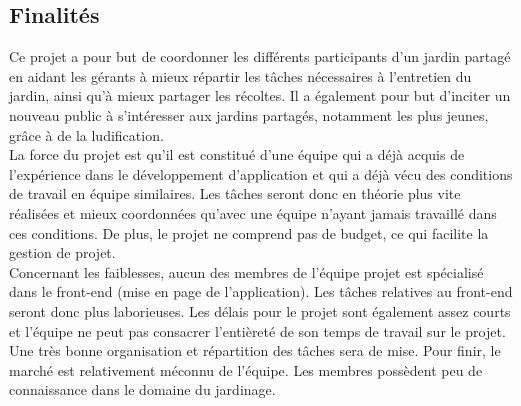 \documentclass{report}
\begin{document}
    
    \subsection*{Finalités}
    Ce projet a pour but de coordonner les différents participants d'un jardin partagé en aidant les gérants à mieux répartir les tâches nécessaires à l'entretien du jardin, ainsi qu'à mieux partager les récoltes. Il a également pour but d'inciter un nouveau public à s'intéresser aux jardins partagés, notamment les plus jeunes, grâce à de la ludification.\\
    
    La force du projet est qu'il est constitué d'une équipe qui a déjà acquis de l'expérience dans le développement d'application et qui a déjà vécu des conditions de travail en équipe similaires. Les tâches seront donc en théorie plus vite réalisées et mieux coordonnées qu'avec une équipe n'ayant jamais travaillé dans ces conditions. De plus, le projet ne comprend pas de budget, ce qui facilite la gestion de projet.\\
    Concernant les faiblesses, aucun des membres de l'équipe projet est spécialisé dans le front-end (mise en page de l'application). Les tâches relatives au front-end seront donc plus laborieuses. Les délais pour le projet sont également assez courts et l'équipe ne peut pas consacrer l'entièreté de son temps de travail sur le projet. Une très bonne organisation et répartition des tâches sera de mise. Pour finir, le marché est relativement méconnu de l'équipe. Les membres possèdent peu de connaissance dans le domaine du jardinage.\\
    
    
    
\end{document}

